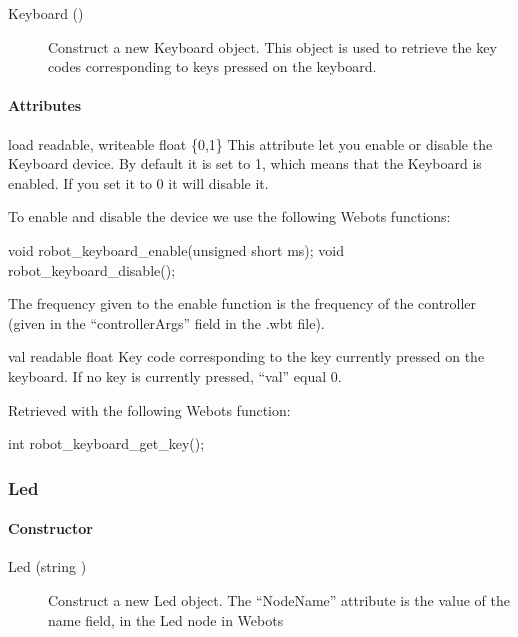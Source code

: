 \noindent
\begin{description}
\item[{Keyboard ()}] Construct a new Keyboard object. This object is
  used to retrieve the key codes corresponding to keys pressed on the
  keyboard.
\end{description}

\paragraph{Attributes}

\noindent
\begin{itemize}
\begin{attribute}{load}
  {readable, writeable}
  {float}
  {\{0,1\}}
  This attribute let you enable or disable the Keyboard
  device.  By default it is set to 1, which means that the Keyboard is
  enabled. If you set it to 0 it will disable it.


  To enable and disable the device we use the following Webots functions:
\begin{cxx}
void robot_keyboard_enable(unsigned short ms);
void robot_keyboard_disable();
\end{cxx}

The frequency given to the enable function is the frequency of the
\urbi controller (given in the ``controllerArgs'' field in the .wbt
file).
\end{attribute}

\begin{attribute}{val}
  {readable}
  {float}
  {}
  Key code corresponding to the key currently pressed on
  the keyboard. If no key is currently pressed, ``val'' equal 0.

  Retrieved with the following Webots function:
\begin{cxx}
int robot_keyboard_get_key();
\end{cxx}
\end{attribute}
\end{itemize}

\subsubsection{Led}

\paragraph{Constructor}

\begin{description}
\item[{Led (string )}] Construct a new Led object. The
  ``NodeName'' attribute is the value of the name field, in the Led
  node in Webots
\end{description}

